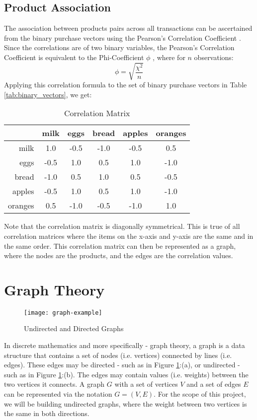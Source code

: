 \subsection{Product Association}
The association between products pairs across all transactions can be ascertained from the binary purchase vectors using the Pearson's Correlation Coefficient . Since the correlations are of two binary variables, the Pearson's Correlation Coefficient is equivalent to the Phi-Coefficient $\phi$ , where for $n$ observations:
\[
\phi = \sqrt{\frac{\chi^2}{n}}
\]
Applying this correlation formula to the set of binary purchase vectors in Table \ref{tab:binary_vectors}, we get:
\begin{table}[H]
\centering
\begin{tabular}{@{}r|ccccc@{}}
\toprule
 & milk & eggs & bread & apples & oranges \\ \midrule
milk &   1.0    & -0.5    & -1.0     & -0.5      & 0.5       \\ \bottomrule
eggs &   -0.5    & 1.0    & 0.5     & 1.0      & -1.0       \\ \bottomrule
bread &  -1.0    & 0.5    & 1.0     & 0.5      & -0.5       \\ \bottomrule
apples & -0.5    & 1.0    & 0.5     & 1.0     & -1.0      \\ \bottomrule
oranges& 0.5    & -1.0    & -0.5     & -1.0      & 1.0      \\ \bottomrule
\end{tabular}
\caption{Correlation Matrix}
\label{tab:correlation}
\end{table}
\noindent Note that the correlation matrix is diagonally symmetrical. This is true of all correlation matrices where the items on the x-axis and y-axis are the same and in the same order. This correlation matrix can then be represented as a graph, where the nodes are the products, and the edges are the correlation values.

\section{Graph Theory}
\begin{figure}[H]
\centering
\texttt{[image: graph-example]}
\caption{Undirected and Directed Graphs}
\label{fig:graph.example}
\end{figure}
In discrete mathematics and more specifically - graph theory, a graph is a data structure that contains a set of nodes (i.e. vertices) connected by lines (i.e. edges).  These edges may be directed - such as in Figure \ref{fig:graph.example}:(a), or undirected - such as in Figure \ref{fig:graph.example}:(b). The edges may contain values (i.e. weights) between the two vertices it connects. A graph $G$ with a set of vertices $V$ and a set of edges $E$ can be represented via the notation $G = (V,E)$. For the scope of this project,  we will be building undirected graphs, where the weight between two vertices is the same in both directions.

